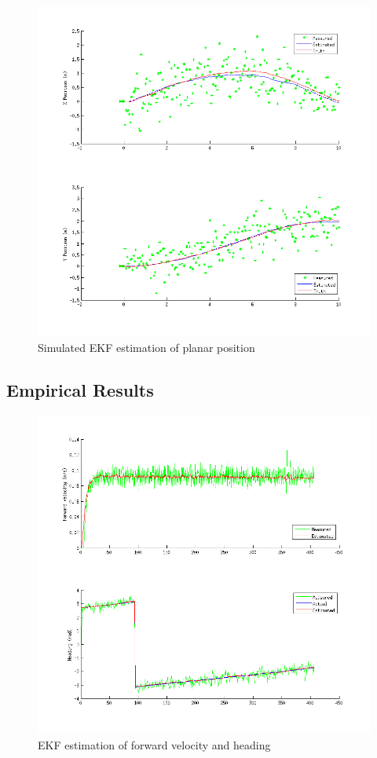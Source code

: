 \documentclass[11pt]{article} %
\begin{document}
\begin{figure}[hbt]
  \centering
  \includegraphics[scale=0.60]{ekf_sim_xy.png}
  \caption{Simulated EKF estimation of planar position}
  \label{ekf_s_xy}
\end{figure}

\clearpage

\subsection{Empirical Results}

\begin{figure} [hbt]
 \centering
 \includegraphics[scale=0.65]{ekf_meas_vh.png} 
 \caption{EKF estimation of forward velocity and heading}
 \label{ekf_m_vh}
\end{figure}
\end{document}
